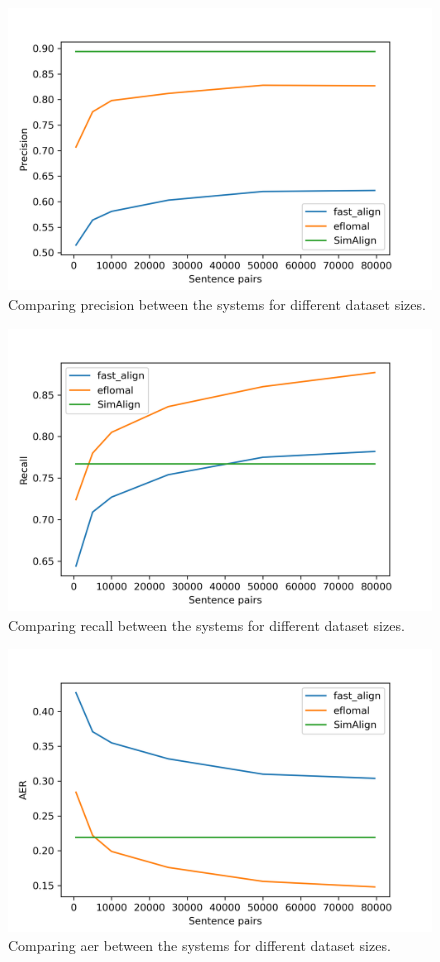 \begin{figure}
\centering
\includegraphics{graphics/charts/precision.png}
\caption{Comparing precision between the systems for different dataset sizes.}
\label{fig:precision}
\end{figure}
\begin{figure}
\centering
\includegraphics{graphics/charts/recall.png}
\caption{Comparing recall between the systems for different dataset sizes.}
\label{fig:recall}
\end{figure}

\begin{figure}
\centering
\includegraphics{graphics/charts/aer.png}
\caption{Comparing \acrshort{aer} between the systems for different dataset sizes.}
\label{fig:aer}
\end{figure}

